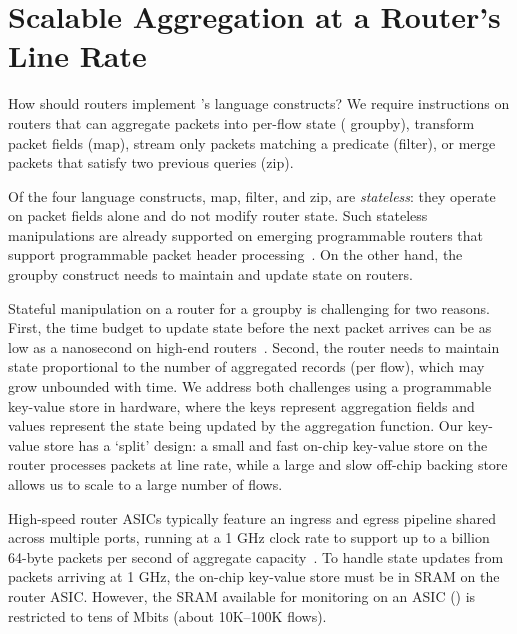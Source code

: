 \section{Scalable Aggregation at a Router's Line Rate}
\label{sec:aggregation}

How should routers implement \TheSystem's language constructs? We require
instructions on routers that can aggregate packets into per-flow state ({\ct
groupby}), transform packet fields ({\ct map}), stream only packets matching a
predicate ({\ct filter}), or merge packets that satisfy two previous queries
({\ct zip}).

Of the four language constructs, {\ct map}, {\ct filter},
and {\ct zip}, are {\em stateless}: they operate on packet fields alone and do not
modify router state. Such stateless manipulations are already supported on
emerging programmable routers that support programmable packet header
processing~\cite{rmt, xpliant, flexpipe, tofino}. On the other hand, the {\ct
groupby} construct needs to maintain and update state on routers.


Stateful manipulation on a router for a {\ct groupby} is challenging for two reasons. First, the
time budget to update state before the next packet arrives can be as low as a
nanosecond on high-end routers~\cite{domino_sigcomm}. Second, the router needs
to maintain state proportional to the number of aggregated records (\eg per flow), which may grow unbounded
with time. We address both challenges using a programmable key-value store in
hardware, where the keys represent aggregation fields and values
represent the state being updated by the aggregation function.
Our key-value store has a `split' design: a small and fast
on-chip key-value store on the router processes packets at line rate, while a
large and slow off-chip backing store allows us to scale to a large number of
flows.

High-speed router ASICs typically feature an ingress and egress pipeline
shared across multiple ports, running at a 1 GHz clock rate to support up to a
billion 64-byte packets per second of aggregate capacity~\cite{rmt}.  To handle
state updates from packets arriving at 1 GHz, the on-chip key-value store must
be in SRAM on the router ASIC. However, the SRAM available for monitoring on an
ASIC () is restricted to tens of Mbits (about 10K--100K flows).

